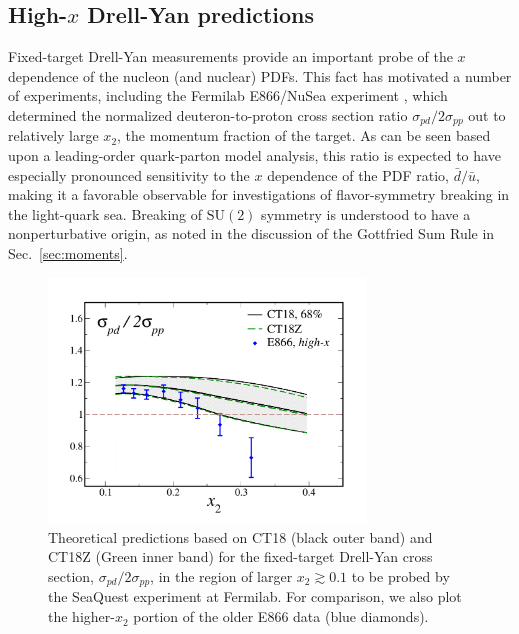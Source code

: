 \subsection{High-$x$ Drell-Yan predictions
\label{sec:SeaQuest}
}
%
%
Fixed-target Drell-Yan measurements provide an important probe of the $x$ dependence of the nucleon
(and nuclear) PDFs. This fact has motivated a number of experiments, including the Fermilab E866/NuSea
experiment \cite{Towell:2001nh}, which determined the normalized deuteron-to-proton cross section ratio
$\sigma_{pd} \big/ 2\sigma_{pp}$ out to relatively large $x_2$, the momentum fraction of the target. As can be seen
based upon a leading-order quark-parton model analysis, this ratio is expected to have
especially pronounced sensitivity to the $x$ dependence of the PDF ratio, $\bar{d}/\bar{u}$,
making it a favorable observable for investigations of flavor-symmetry breaking in the light-quark
sea. Breaking of $\mathrm{SU}(2)$ symmetry is understood to have a nonperturbative origin, as noted in
the discussion of the Gottfried Sum Rule in Sec.~\ref{sec:moments}.

\begin{figure}[h]
	\begin{center}
		\includegraphics[width=0.75\textwidth]{./fig/CT18-prediction_E866_68.pdf}
	\end{center}
	\vspace{-2ex}
	\caption{ Theoretical predictions based on CT18 (black outer band) and CT18Z (Green inner band) for the fixed-target Drell-Yan
	cross section, $\sigma_{pd} \big/ 2\sigma_{pp}$, in the region of larger $x_2 \gtrsim 0.1$ to be probed by the SeaQuest experiment \cite{Aidala:2017ofy} at Fermilab. For comparison, we also plot the higher-$x_2$ portion of the older E866 data \cite{Towell:2001nh} (blue diamonds). }
\label{fig:hix_DY}
\end{figure}


